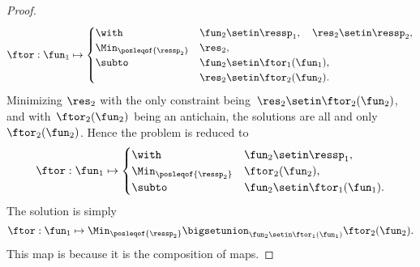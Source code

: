 \begin{proof}
    \begin{equation}
        \ftor:\fun_{1}\mapsto\begin{cases}
            \with                        & \fun_{2}\setin\ressp_{1},\quad\res_{2}\setin\ressp_{2}, \\
            \Min_{\posleqof{\ressp_{2}}} & \res_{2},                                               \\
            \subto                       & \fun_{2}\setin\ftor_{1}(\fun_{1}),                      \\
                                         & \res_{2}\setin\ftor_{2}(\fun_{2}).
        \end{cases}\label{eq:dede-2}
    \end{equation}
    Minimizing $\res_{2}$ with the only constraint being~$\res_{2}\setin\ftor_{2}(\fun_{2})$, and with~$\ftor_{2}(\fun_{2})$ being an antichain, the solutions are all and only~$\ftor_{2}(\fun_{2})$.
    Hence the problem is reduced to
    \begin{equation}
        \ftor:\fun_{1}\mapsto\begin{cases}
            \with                        & \fun_{2}\setin\ressp_{1},          \\
            \Min_{\posleqof{\ressp_{2}}} & \ftor_{2}(\fun_{2}),               \\
            \subto                       & \fun_{2}\setin\ftor_{1}(\fun_{1}).
        \end{cases}\label{eq:dede-2-1}
    \end{equation}
    The solution is simply
    \begin{equation}
        \ftor:\fun_{1}\mapsto\Min_{\posleqof{\ressp_{2}}}\bigsetunion_{\fun_{2}\setin\ftor_{1}(\fun_{1})}\ftor_{2}(\fun_{2}).
        \label{eq:ora}
    \end{equation}
    This map is \scottcontinuous because it is the composition of \scottcontinuous maps.
\end{proof}

